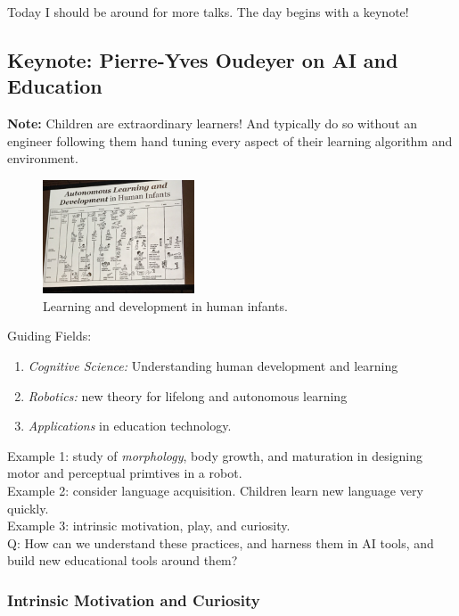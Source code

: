 Today I should be around for more talks. The day begins with a keynote!

\subsection{Keynote: Pierre-Yves Oudeyer on AI and Education}

{\bf Note:} Children are extraordinary learners! And typically do so without an engineer following them hand tuning every aspect of their learning algorithm and environment. \\

\begin{figure}[h!]
    \centering
    \includegraphics[width=0.4\textwidth]{images/child_learners.JPG}
    \caption{Learning and development in human infants.}
    \label{fig:child learners}
\end{figure}

Guiding Fields:
\begin{enumerate}
    \item {\it Cognitive Science:} Understanding human development and learning
    \item {\it Robotics:} new theory for lifelong and autonomous learning
    \item {\it Applications} in education technology.
\end{enumerate}


Example 1: study of {\it morphology}, body growth, and maturation in designing motor and perceptual primtives in a robot. \\

Example 2: consider language acquisition. Children learn new language very quickly. \\

Example 3: intrinsic motivation, play, and curiosity. \\

Q: How can we understand these practices, and harness them in AI tools, and build new educational tools around them? \\

\subsubsection{Intrinsic Motivation and Curiosity}

